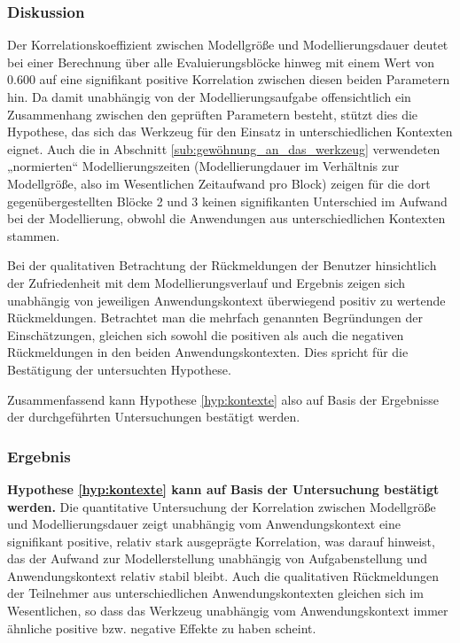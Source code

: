 \subsubsection{Diskussion} 

Der Korrelationskoeffizient zwischen Modellgröße und Modellierungsdauer deutet bei einer Berechnung über alle Evaluierungsblöcke hinweg mit einem Wert von $0.600$ auf eine signifikant positive Korrelation zwischen diesen beiden Parametern hin. Da damit unabhängig von der Modellierungsaufgabe offensichtlich ein Zusammenhang zwischen den geprüften Parametern besteht, stützt dies die Hypothese, das sich das Werkzeug für den Einsatz in unterschiedlichen Kontexten eignet. Auch die in Abschnitt \ref{sub:gewöhnung_an_das_werkzeug} verwendeten „normierten“ Modellierungszeiten (Modellierungdauer im Verhältnis zur Modellgröße, also im Wesentlichen Zeitaufwand pro Block) zeigen für die dort gegenübergestellten Blöcke 2 und 3 keinen signifikanten Unterschied im Aufwand bei der Modellierung, obwohl die Anwendungen aus unterschiedlichen Kontexten stammen.

Bei der qualitativen Betrachtung der Rückmeldungen der Benutzer hinsichtlich der Zufriedenheit mit dem Modellierungsverlauf und Ergebnis zeigen sich unabhängig von jeweiligen Anwendungskontext überwiegend positiv zu wertende Rückmeldungen. Betrachtet man die mehrfach genannten Begründungen der Einschätzungen, gleichen sich sowohl die positiven als auch die negativen Rückmeldungen in den beiden Anwendungskontexten. Dies spricht für die Bestätigung der untersuchten Hypothese.

Zusammenfassend kann Hypothese \ref{hyp:kontexte} also auf Basis der Ergebnisse der durchgeführten Untersuchungen bestätigt werden.

\subsubsection{Ergebnis} 

\textbf{Hypothese \ref{hyp:kontexte} kann auf Basis der Untersuchung bestätigt werden.} Die quantitative Untersuchung der Korrelation zwischen Modellgröße und Modellierungsdauer zeigt unabhängig vom Anwendungskontext eine signifikant positive, relativ stark ausgeprägte Korrelation, was darauf hinweist, das der Aufwand zur Modellerstellung unabhängig von Aufgabenstellung und Anwendungskontext relativ stabil bleibt. Auch die qualitativen Rückmeldungen der Teilnehmer aus unterschiedlichen Anwendungskontexten gleichen sich im Wesentlichen, so dass das Werkzeug unabhängig vom Anwendungskontext immer ähnliche positive bzw. negative Effekte zu haben scheint.

